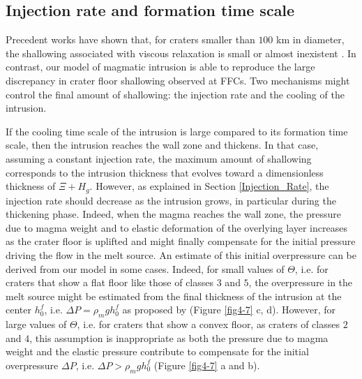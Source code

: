 \begin{article}
		\subsection{Injection rate and formation time scale}
		\label{InjectionRateDiscussion}
		
		Precedent works  have shown that, for  craters smaller
                than $100$  km in diameter, the  shallowing associated
                with viscous relaxation is  small or almost inexistent
                \citep{Dombard2001}.   In  contrast,   our  model   of
                magmatic  intrusion is  able  to  reproduce the  large
                discrepancy  in crater  floor  shallowing observed  at
                FFCs. Two mechanisms might control the final amount of
                shallowing: the injection rate  and the cooling of the
                intrusion.
		
		If the  cooling time scale  of the intrusion  is large
                compared  to  its  formation   time  scale,  then  the
                intrusion reaches the wall  zone and thickens. In that
                case, assuming a constant  injection rate, the maximum
                amount  of  shallowing  corresponds to  the  intrusion
                thickness   that   evolves  toward   a   dimensionless
                thickness of  $\Xi +  H_g$.  However, as  explained in
                Section   \ref{Injection_Rate},  the   injection  rate
                should decrease as the  intrusion grows, in particular
                during the  thickening phase.  Indeed, when  the magma
                reaches  the  wall zone,  the  pressure  due to  magma
                weight  and to  elastic deformation  of the  overlying
                layer increases  as the  crater floor is  uplifted and
                might  finally  compensate  for the  initial  pressure
                driving the  flow in the  melt source. An  estimate of
                this  initial overpressure  can  be  derived from  our
                model  in  some cases.  Indeed,  for  small values  of
                $\Theta$, i.e. for craters that show a flat floor like
                those of classes $3$ and  $5$, the overpressure in the
                melt  source   might  be  estimated  from   the  final
                thickness  of the  intrusion  at  the center  $h_0^f$,
                i.e.  $\Delta   P=\rho_{m}gh_{0}^f$  as   proposed  by
                \citet{Jozwiak2012}     (Figure    \ref{fig4-7}     c,
                d). However,  for large  values of $\Theta$,  i.e. for
                craters  that  show  a  convex floor,  as  craters  of
                classes $2$ and $4$,  this assumption is inappropriate
                as  both the  pressure  due to  magma  weight and  the
                elastic  pressure  contribute  to compensate  for  the
                initial     overpressure      $\Delta     P$,     i.e.
                $\Delta P>  \rho_m gh_0^f$ (Figure \ref{fig4-7}  a and
                b).
	

\end{article}
